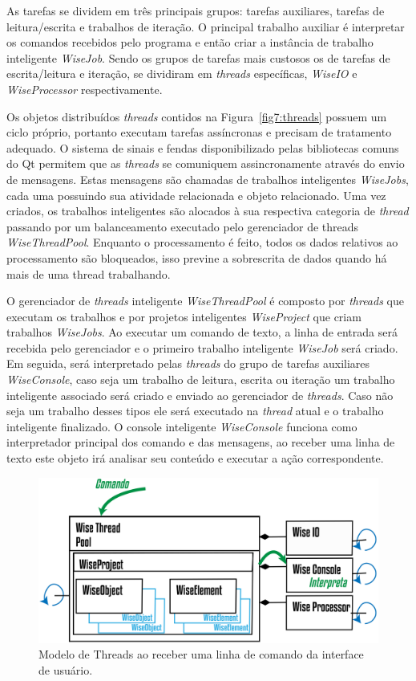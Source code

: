 As tarefas se dividem em três principais grupos: tarefas auxiliares, tarefas de leitura/escrita e trabalhos de iteração. O principal trabalho auxiliar é interpretar os comandos recebidos pelo programa e então criar a instância de trabalho inteligente \textit{WiseJob}. Sendo os grupos de tarefas mais custosos os de tarefas de escrita/leitura e iteração, se dividiram em \textit{threads} específicas, \textit{WiseIO} e \textit{WiseProcessor} respectivamente.

Os objetos distribuídos \textit{threads} contidos na Figura~\ref{fig7:threads} possuem um ciclo próprio, portanto executam tarefas assíncronas e precisam de tratamento adequado. O sistema de sinais e fendas disponibilizado pelas bibliotecas comuns do Qt permitem que as \textit{threads} se comuniquem assincronamente através do envio de mensagens. Estas mensagens são chamadas de trabalhos inteligentes \textit{WiseJobs}, cada uma possuindo sua atividade relacionada e objeto relacionado. Uma vez criados, os trabalhos inteligentes são alocados à sua respectiva categoria de \textit{thread} passando por um balanceamento executado pelo gerenciador de threads \textit{WiseThreadPool}. Enquanto o processamento é feito, todos os dados relativos ao processamento são bloqueados, isso previne a sobrescrita de dados quando há mais de uma thread trabalhando.

O gerenciador de \textit{threads} inteligente \textit{WiseThreadPool} é composto por \textit{threads} que executam os trabalhos e por projetos inteligentes \textit{WiseProject} que criam trabalhos \textit{WiseJobs}. Ao executar um comando de texto, a linha de entrada será recebida pelo gerenciador e o primeiro trabalho inteligente \textit{WiseJob} será criado. Em seguida, será interpretado pelas \textit{threads} do grupo de tarefas auxiliares \textit{WiseConsole}, caso seja um trabalho de leitura, escrita ou iteração um trabalho inteligente associado será criado e enviado ao gerenciador de \textit{threads}. Caso não seja um trabalho desses tipos ele será executado na \textit{thread} atual e o trabalho inteligente finalizado. O console inteligente \textit{WiseConsole} funciona como interpretador principal dos comando e das mensagens, ao receber uma linha de texto este objeto irá analisar seu conteúdo e executar a ação correspondente.

\begin{figure}[!htbp]
	\centering
	\includegraphics[width=\linewidth]{Figures/WiseThreaPoolCMD@16x.png}
	\caption{Modelo de Threads ao receber uma linha de comando da interface de usuário.}
	\label{fig8:threads}
\end{figure}

